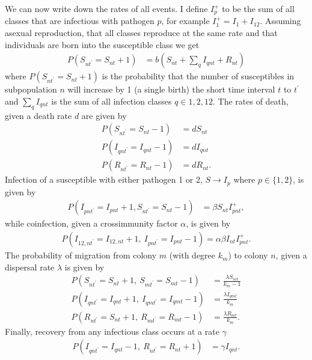 We can now write down the rates of all events. 
I define $I^+_p$ to be the sum of all classes that are infectious with pathogen $p$, for example $I^+_1 = I_1 + I_{12}$. 
Assuming asexual reproduction, that all classes reproduce at the same rate and that individuals are born into the susceptible class we get
\begin{align}
  P\left( S_{nt^\prime} = S_{nt} +1\right) &= b\left( S_{nt}+\sum_q I_{qnt} + R_{nt}\right) 
\end{align}
where $P\left( S_{nt^\prime} = S_{nt} +1\right)$ is the probability that the number of susceptibles in subpopulation $n$ will increase by 1 (a single birth) the short time interval $t$ to $t^\prime$ and $\sum_q I_{qnt}$ is the sum of all infection classes $q \in {1, 2, 12}$.
The rates of death, given a death rate $d$ are given by
\begin{align}
  P\left( S_{nt^\prime} = S_{nt}-1 \right) &= dS_{nt} \\
  P\left( I_{qnt^\prime} = I_{qnt}-1 \right) &= dI_{qnt}\\
  P\left( R_{nt^\prime} = R_{nt}-1 \right) &= dR_{nt}.
\end{align}
Infection of a susceptible with either pathogen 1 or 2, $S \rightarrow I_p$ where $p\in \{1,2\}$, is given by
\begin{align}
  P\left( I_{pnt^\prime} = I_{pnt}+1, S_{nt^\prime} = S_{nt}-1 \right) &= \beta S_{nt}I^+_{pnt},
\end{align}
while coinfection, given a crossimmunity factor $\alpha$, is given by
\begin{align}
  P\left( I_{12,nt^\prime} = I_{12,nt}+1,\: I_{pnt^\prime} = I_{pnt}-1\right) = \alpha\beta I_{nt}I^+_{pnt}.
\end{align}
The probability of migration from colony $m$ (with degree $k_m$) to colony $n$, given a dispersal rate $\lambda$ is given by
\begin{align}
  P\left(S_{nt^\prime}=S_{nt}+1,\: S_{mt^\prime} = S_{mt}-1\right) &= \frac{\lambda S_{mt}}{k_m-1}\\
  P\left(I_{qnt^\prime}=I_{qnt}+1,\: I_{qmt^\prime} = I_{qmt}-1\right) &= \frac{\lambda I_{qmt}}{k_m}\\
  P\left(R_{nt^\prime}=S_{nt}+1,\: R_{mt^\prime} = R_{mt}-1\right) &= \frac{\lambda R_{mt}}{k_m}.
\end{align}
Finally, recovery from any infectious class occurs at a rate $\gamma$
\begin{align}
  P\left( I_{qnt^\prime} = I_{qnt}-1,\: R_{nt^\prime} = R_{nt}+1 \right) &= \gamma I_{qnt}.
\end{align}



